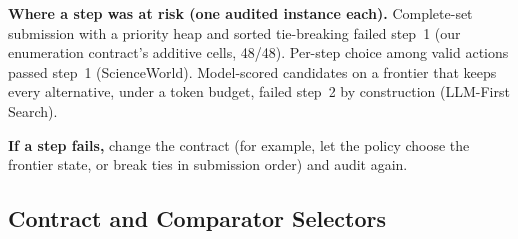 \begin{protocolbox}[!t]
\begin{tcolorbox}[
  title={Four-step validation},
  colbacktitle=black!60,
  coltitle=white,
  colback=black!3,
  colframe=black!60,
  fonttitle=\bfseries,
  fontupper=\small,
  boxrule=0.5pt,
  boxsep=5pt]
\smallskip
\textbf{Where a step was at risk (one audited instance each).} Complete-set submission with a priority heap and sorted tie-breaking failed step~1 (our enumeration contract's additive cells, 48/48). Per-step choice among valid actions passed step~1 (ScienceWorld). Model-scored candidates on a frontier that keeps every alternative, under a token budget, failed step~2 by construction (LLM-First Search).

\smallskip
\textbf{If a step fails,} change the contract (for example, let the policy choose the frontier state, or break ties in submission order) and audit again.
\end{tcolorbox}
\end{protocolbox}

\subsection{Contract and Comparator Selectors}
\label{app:cf-contract}

